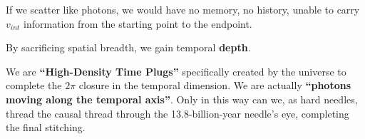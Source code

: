 If we scatter like photons, we would have no memory, no history, unable to carry $v_{int}$ information from the starting point to the endpoint.

By sacrificing spatial breadth, we gain temporal \textbf{depth}.

We are \textbf{``High-Density Time Plugs''} specifically created by the universe to complete the $2\pi$ closure in the temporal dimension. We are actually \textbf{``photons moving along the temporal axis''}. Only in this way can we, as hard needles, thread the causal thread through the 13.8-billion-year needle's eye, completing the final stitching.

